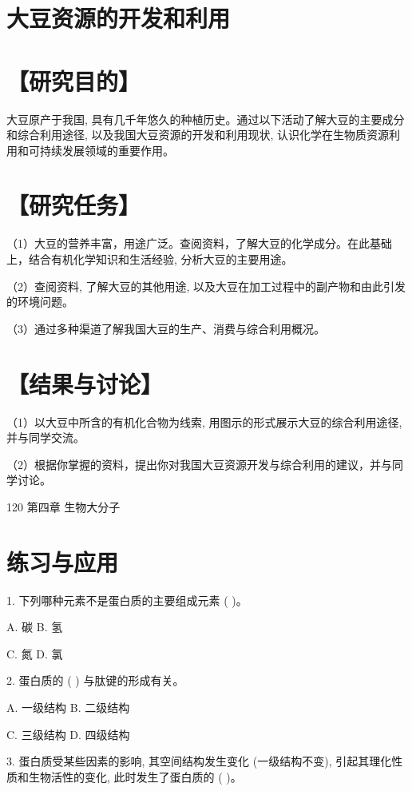 \documentclass[10pt]{article}
\begin{document}
\section*{大豆资源的开发和利用}

\section*{【研究目的】}

大豆原产于我国, 具有几千年悠久的种植历史。通过以下活动了解大豆的主要成分和综合利用途径, 以及我国大豆资源的开发和利用现状, 认识化学在生物质资源利用和可持续发展领域的重要作用。

\section*{【研究任务】}

（1）大豆的营养丰富，用途广泛。查阅资料，了解大豆的化学成分。在此基础上，结合有机化学知识和生活经验, 分析大豆的主要用途。

（2）查阅资料, 了解大豆的其他用途, 以及大豆在加工过程中的副产物和由此引发的环境问题。

（3）通过多种渠道了解我国大豆的生产、消费与综合利用概况。

\section*{【结果与讨论】}

（1）以大豆中所含的有机化合物为线索, 用图示的形式展示大豆的综合利用途径, 并与同学交流。

（2）根据你掌握的资料，提出你对我国大豆资源开发与综合利用的建议，并与同学讨论。

120 第四章 生物大分子

\section*{练习与应用}

1. 下列哪种元素不是蛋白质的主要组成元素 ( )。

A. 碳 B. 氢

C. 氮 D. 氯

2. 蛋白质的 ( ) 与肽键的形成有关。

A. 一级结构 B. 二级结构

C. 三级结构 D. 四级结构

3. 蛋白质受某些因素的影响, 其空间结构发生变化 (一级结构不变), 引起其理化性质和生物活性的变化, 此时发生了蛋白质的 ( )。
\end{document}
